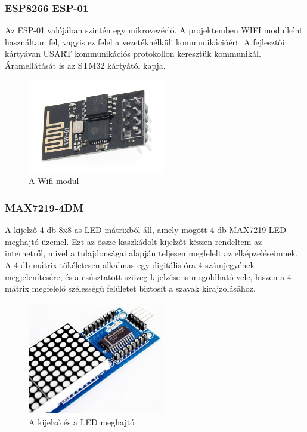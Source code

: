 \documentclass[a4paper, 12pt]{article}
\begin{document}
\subsubsection{ESP8266 ESP-01}
Az ESP-01 valójában szintén egy mikrovezérlő. A projektemben WIFI modulként használtam fel, vagyis ez felel a vezetéknélküli kommunikációért. A fejlesztői kártyávan USART kommunikációs protokollon keresztük kommunikál. Áramellátását is az STM32 kártyától kapja.

\begin{figure}[ht]
	\centering
	\includegraphics[width = 6cm]{images/esp01.jpg}
	\caption{A Wifi modul}
	\label{fig:esp01}
\end{figure}	

\subsubsection{MAX7219-4DM}
A kijelző 4 db 8x8-as LED mátrixból áll, amely mögött 4 db MAX7219 LED meghajtó üzemel. Ezt az össze kaszkádolt kijelzőt készen rendeltem az internetről, mivel a tulajdonságai alapján teljesen megfelelt az elképzeléseimnek. A 4 db mátrix tökéletesen alkalmas egy digitális óra 4 számjegyének megjelenítésére, és a csúsztatott szöveg kijelzése is megoldható vele, hiszen a 4 mátrix megfelelő szélességű felületet biztosít a szavak kirajzolásához.

\begin{figure}[ht]
	\centering
	\includegraphics[width = 6cm]{images/matrix.jpg}
	\caption{A kijelző és a LED meghajtó}
	\label{fig:matrix}
\end{figure}	
\end{document}
